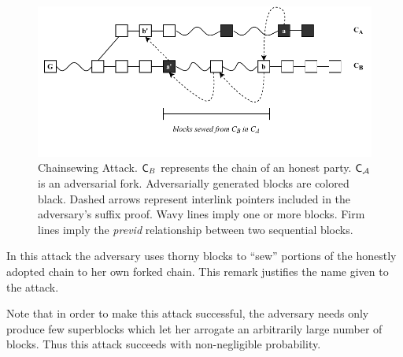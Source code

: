 \begin{figure}[h!]
	\begin{center}
		\includegraphics[width=\columnwidth]{figures/chainsewing_attack.pdf}
	\end{center}
	\caption{Chainsewing Attack. $\mathsf{C}_B$ represents the chain of an honest party. $\mathsf{C}_\mathcal{A}$ is an adversarial fork. Adversarially generated blocks are colored black. Dashed arrows represent interlink pointers included in the adversary's suffix proof. Wavy lines imply one or more blocks. Firm lines imply the \emph{previd} relationship between two sequential blocks.}
	\label{fig:attack}
\end{figure}

In this attack the adversary uses thorny blocks to ``sew'' portions of the honestly adopted chain to her own forked chain. This remark justifies the name given to the attack.

Note that in order to make this attack successful, the adversary needs only produce few superblocks which let her arrogate an arbitrarily large number of blocks. Thus this attack succeeds with non-negligible probability.
